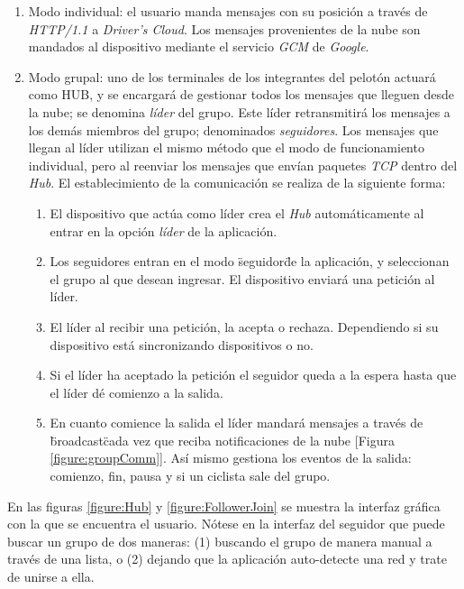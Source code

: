 \begin{enumerate}
	\item Modo individual: el usuario manda mensajes con su posición a través de \emph{HTTP/1.1} a \emph{Driver's Cloud}. Los mensajes provenientes de la nube son mandados al dispositivo mediante el servicio \emph{GCM} de \emph{Google}.

	\item Modo grupal: uno de los terminales de los integrantes del pelotón actuará	como HUB, y se encargará de	gestionar todos los mensajes que lleguen desde la nube; se denomina \emph{líder} del grupo. Este líder retransmitirá los mensajes a los demás miembros del grupo; denominados \emph{seguidores}. Los mensajes que llegan al líder utilizan el mismo método que el modo de funcionamiento individual, pero al reenviar los mensajes que envían paquetes \emph{TCP} dentro del \emph{Hub}. El establecimiento de la comunicación se realiza de la siguiente forma:

	\begin{enumerate}
		\item El dispositivo que actúa como líder crea el \emph{Hub} automáticamente al entrar en la opción \emph{líder} de la aplicación.

		\item Los seguidores entran en el modo \"seguidor\" de la aplicación, y seleccionan el grupo al que desean ingresar. El dispositivo enviará una petición al líder.

		\item El líder al recibir una petición, la acepta o rechaza. Dependiendo si su dispositivo está sincronizando dispositivos o no.

		\item Si el líder ha aceptado la petición el seguidor queda a la espera hasta que el líder dé comienzo a la salida.

		\item En cuanto comience la salida el líder mandará mensajes a través de \"broadcast\" cada vez que reciba notificaciones de la nube [Figura \ref{figure:groupComm}]. Así mismo	gestiona los eventos de la salida: comienzo, fin, pausa y si un ciclista sale del grupo.
	\end{enumerate}
\end{enumerate}

En las figuras \ref{figure:Hub} y \ref{figure:FollowerJoin} se muestra la interfaz gráfica con la que se encuentra el usuario. Nótese en la interfaz del seguidor que puede buscar un grupo de dos maneras: (1) buscando el grupo de manera manual a través de una lista, o (2) dejando que la aplicación auto-detecte una red y trate de unirse a ella.

